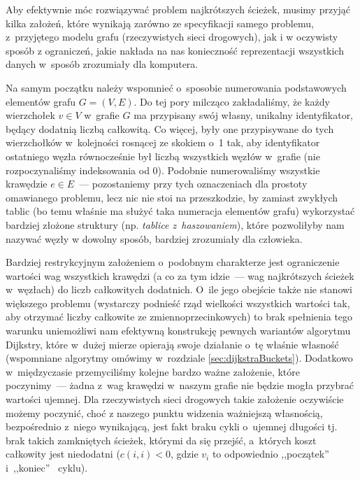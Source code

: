 Aby efektywnie móc rozwiązywać problem najkrótszych ścieżek, musimy przyjąć kilka założeń, które wynikają zarówno ze specyfikacji samego problemu, z~przyjętego modelu grafu (rzeczywistych sieci drogowych), jak i w oczywisty sposób z ograniczeń, jakie nakłada na nas konieczność reprezentacji wszystkich danych w~sposób zrozumiały dla komputera.

Na samym początku należy wspomnieć o~sposobie numerowania podstawowych elementów grafu $G = \left( V, E \right)$. Do tej pory milcząco zakładaliśmy, że każdy wierzchołek $v \in V$ w~grafie $G$ ma przypisany swój własny, unikalny identyfikator, będący dodatnią liczbą całkowitą. Co więcej, były one przypisywane do tych wierzchołków w~kolejności rosnącej ze skokiem o~1 tak, aby identyfikator ostatniego węzła równocześnie był liczbą wszystkich węzłów w~grafie (nie rozpoczynaliśmy indeksowania od $0$). Podobnie numerowaliśmy wszystkie krawędzie $e \in E$~---  pozostaniemy przy tych oznaczeniach dla prostoty omawianego problemu, lecz nic nie stoi na przeszkodzie, by zamiast zwykłych tablic (bo temu właśnie ma służyć taka numeracja elementów grafu) wykorzystać bardziej złożone struktury (np. \textit{tablice z~haszowaniem}), które pozwoliłyby nam nazywać węzły w dowolny sposób, bardziej zrozumiały dla człowieka.

Bardziej restrykcyjnym założeniem o~podobnym charakterze jest ograniczenie wartości wag wszystkich krawędzi (a co za tym idzie~--- wag najkrótszych ścieżek w~węzłach) do liczb całkowitych dodatnich. O~ile jego obejście także nie stanowi większego problemu (wystarczy podnieść rząd wielkości wszystkich wartości tak, aby otrzymać liczby całkowite ze zmiennoprzecinkowych) to brak spełnienia tego warunku uniemożliwi nam efektywną konstrukcję pewnych wariantów algorytmu Dijkstry, które w~dużej mierze opierają swoje działanie o~tę właśnie własność (wspomniane algorytmy omówimy w~rozdziale \ref{sec:dijkstraBuckets}). Dodatkowo w~międzyczasie przemyciliśmy kolejne bardzo ważne założenie, które poczynimy~---  żadna z~wag krawędzi w~naszym grafie nie będzie mogła przybrać wartości ujemnej. Dla rzeczywistych sieci drogowych takie założenie oczywiście możemy poczynić, choć z naszego punktu widzenia ważniejszą własnością, bezpośrednio z~niego wynikającą, jest fakt braku cykli o~ujemnej długości tj. brak takich zamkniętych ścieżek, którymi da się przejść, a~których koszt całkowity jest niedodatni ($ c \left( i, i \right) < 0 $, gdzie $v_{i}$ to odpowiednio ,,początek''~ i~,,koniec''~ cyklu). 


